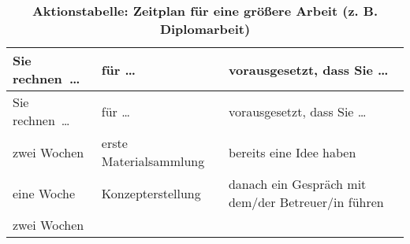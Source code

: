 \documentclass[]{article}
\begin{document}
\begin{longtable}[]{@{}lll@{}}
\caption{\textbf{Aktionstabelle: Zeitplan für eine größere Arbeit (z. B.
Diplomarbeit)}}\tabularnewline
\toprule
\begin{minipage}[b]{0.16\columnwidth}\raggedright\strut
Sie rechnen~\ldots{}\strut
\end{minipage} & \begin{minipage}[b]{0.35\columnwidth}\raggedright\strut
für \ldots{}\strut
\end{minipage} & \begin{minipage}[b]{0.41\columnwidth}\raggedright\strut
vorausgesetzt, dass Sie \ldots{}\strut
\end{minipage}\tabularnewline
\midrule
\endfirsthead
\toprule
\begin{minipage}[b]{0.16\columnwidth}\raggedright\strut
Sie rechnen~\ldots{}\strut
\end{minipage} & \begin{minipage}[b]{0.35\columnwidth}\raggedright\strut
für \ldots{}\strut
\end{minipage} & \begin{minipage}[b]{0.41\columnwidth}\raggedright\strut
vorausgesetzt, dass Sie \ldots{}\strut
\end{minipage}\tabularnewline
\midrule
\endhead
\begin{minipage}[t]{0.16\columnwidth}\raggedright\strut
zwei Wochen\strut
\end{minipage} & \begin{minipage}[t]{0.35\columnwidth}\raggedright\strut
erste Materialsammlung\strut
\end{minipage} & \begin{minipage}[t]{0.41\columnwidth}\raggedright\strut
bereits eine Idee haben\strut
\end{minipage}\tabularnewline
\begin{minipage}[t]{0.16\columnwidth}\raggedright\strut
eine Woche\strut
\end{minipage} & \begin{minipage}[t]{0.35\columnwidth}\raggedright\strut
Konzepterstellung\strut
\end{minipage} & \begin{minipage}[t]{0.41\columnwidth}\raggedright\strut
danach ein Gespräch mit dem/der Betreuer/in führen\strut
\end{minipage}\tabularnewline
\begin{minipage}[t]{0.16\columnwidth}\raggedright\strut
zwei Wochen\strut
\end{minipage} & \begin{minipage}[t]{0.35\columnwidth}\raggedright\strut

\end{minipage}
\end{longtable}
\end{document}
